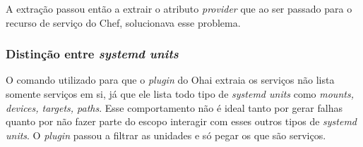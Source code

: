 A extração passou então a extrair o atributo \textit{provider} que ao ser passado
para o recurso de serviço do Chef, solucionava esse problema.

\subsubsection{Distinção entre \textit{systemd units}}
O comando utilizado para que o \textit{plugin} do Ohai extraia os serviços não
lista somente serviços em si, já que ele lista todo tipo de \textit{systemd units}
como \textit{mounts, devices, targets, paths}. Esse comportamento não é ideal
tanto por gerar falhas quanto por não fazer parte do escopo interagir com esses
outros tipos de \textit{systemd units}. O \textit{plugin} passou a filtrar as
unidades e só pegar os que são serviços.
